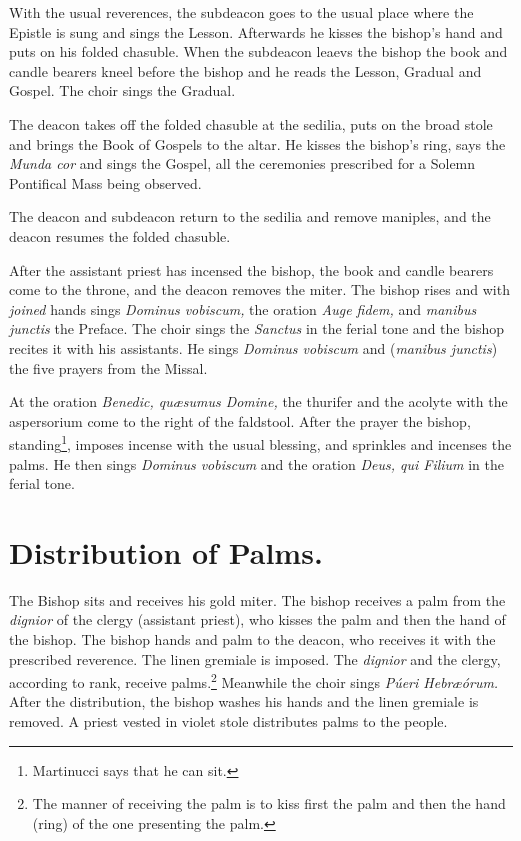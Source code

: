 {\rubric With the usual reverences, the subdeacon goes to the usual place where
the Epistle is sung and sings the Lesson. Afterwards he kisses the bishop's
hand and puts on his folded chasuble. When the subdeacon leaevs the bishop the
book and candle bearers kneel before the bishop and he reads the Lesson,
Gradual and Gospel. The choir sings the Gradual.

\rubric The deacon takes off the folded chasuble at the sedilia, puts on the
broad stole and brings the Book of Gospels to the altar. He kisses the bishop's
ring, says the \textit{Munda cor} and sings the Gospel, all the ceremonies
prescribed for a Solemn Pontifical Mass being observed.

\rubric The deacon and subdeacon return to the sedilia and remove maniples, and
the deacon resumes the folded chasuble.

\rubric After the assistant priest has incensed the bishop, the book and candle
bearers come to the throne, and the deacon removes the miter. The bishop rises
and with \textit{joined} hands sings \textit{Dominus vobiscum,} the oration
\textit{Auge fidem,} and \textit{manibus junctis} the Preface. The choir sings
the \textit{Sanctus} in the ferial tone and the bishop recites it with his
assistants. He sings \textit{Dominus vobiscum} and (\textit{manibus junctis})
the five prayers from the Missal.

\rubric At the oration \textit{Benedic, qu\ae sumus Domine,} the thurifer and
the acolyte with the aspersorium come to the right of the faldstool. After the
prayer the bishop, standing\footnote{Martinucci says that he can sit.}, imposes
incense with the usual blessing, and sprinkles and incenses the palms. He then
sings \textit{Dominus vobiscum} and the oration \textit{Deus, qui Filium} in
the ferial tone.

\section{Distribution of Palms.}

\rubric The Bishop sits and receives his gold miter. The bishop receives a palm
from the \textit{dignior} of the clergy (assistant priest), who kisses the palm
and then the hand of the bishop. The bishop hands and palm to the deacon, who
receives it with the prescribed reverence. The linen gremiale is imposed. The
\textit{dignior} and the clergy, according to rank, receive palms.\footnote{The
manner of receiving the palm is to kiss first the palm and then the hand (ring)
of the one presenting the palm.} Meanwhile the choir sings \textit{Púeri
Hebr\ae órum.} After the distribution, the bishop washes his hands and the
linen gremiale is removed. A priest vested in violet stole distributes palms to
the people. 

}
